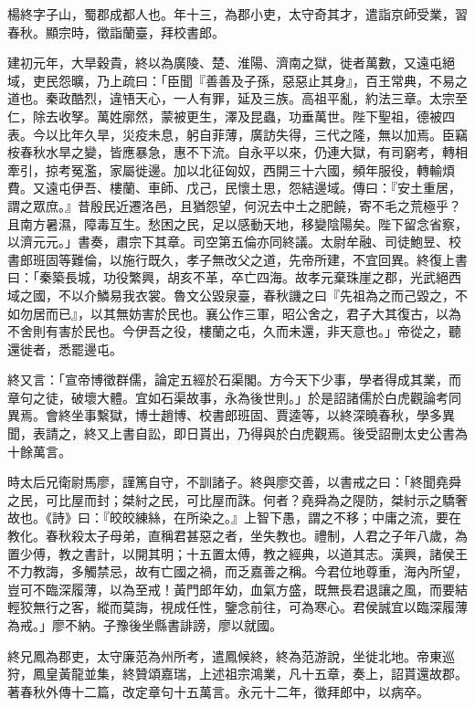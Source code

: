 
\begin{pinyinscope}
楊終字子山，蜀郡成都人也。年十三，為郡小吏，太守奇其才，遣詣京師受業，習春秋。顯宗時，徵詣蘭臺，拜校書郎。

建初元年，大旱穀貴，終以為廣陵、楚、淮陽、濟南之獄，徙者萬數，又遠屯絕域，吏民怨曠，乃上疏曰：「臣聞『善善及子孫，惡惡止其身』，百王常典，不易之道也。秦政酷烈，違啎天心，一人有罪，延及三族。高祖平亂，約法三章。太宗至仁，除去收孥。萬姓廓然，蒙被更生，澤及昆蟲，功垂萬世。陛下聖祖，德被四表。今以比年久旱，災疫未息，躬自菲薄，廣訪失得，三代之隆，無以加焉。臣竊桉春秋水旱之變，皆應暴急，惠不下流。自永平以來，仍連大獄，有司窮考，轉相牽引，掠考冤濫，家屬徙邊。加以北征匈奴，西開三十六國，頻年服役，轉輸煩費。又遠屯伊吾、樓蘭、車師、戊己，民懷土思，怨結邊域。傳曰：『安土重居，謂之眾庶。』昔殷民近遷洛邑，且猶怨望，何況去中土之肥饒，寄不毛之荒極乎？且南方暑濕，障毒互生。愁困之民，足以感動天地，移變陰陽矣。陛下留念省察，以濟元元。」書奏，肅宗下其章。司空第五倫亦同終議。太尉牟融、司徒鮑昱、校書郎班固等難倫，以施行既久，孝子無改父之道，先帝所建，不宜回異。終復上書曰：「秦築長城，功役繁興，胡亥不革，卒亡四海。故孝元棄珠崖之郡，光武絕西域之國，不以介鱗易我衣裳。魯文公毀泉臺，春秋譏之曰『先祖為之而己毀之，不如勿居而已』，以其無妨害於民也。襄公作三軍，昭公舍之，君子大其復古，以為不舍則有害於民也。今伊吾之役，樓蘭之屯，久而未還，非天意也。」帝從之，聽還徙者，悉罷邊屯。

終又言：「宣帝博徵群儒，論定五經於石渠閣。方今天下少事，學者得成其業，而章句之徒，破壞大體。宜如石渠故事，永為後世則。」於是詔諸儒於白虎觀論考同異焉。會終坐事繫獄，博士趙博、校書郎班固、賈逵等，以終深曉春秋，學多異聞，表請之，終又上書自訟，即日貰出，乃得與於白虎觀焉。後受詔刪太史公書為十餘萬言。

時太后兄衛尉馬廖，謹篤自守，不訓諸子。終與廖交善，以書戒之曰：「終聞堯舜之民，可比屋而封；桀紂之民，可比屋而誅。何者？堯舜為之隄防，桀紂示之驕奢故也。《詩》曰：『皎皎練絲，在所染之。』上智下愚，謂之不移；中庸之流，要在教化。春秋殺太子母弟，直稱君甚惡之者，坐失教也。禮制，人君之子年八歲，為置少傅，教之書計，以開其明；十五置太傅，教之經典，以道其志。漢興，諸侯王不力教誨，多觸禁忌，故有亡國之禍，而乏嘉善之稱。今君位地尊重，海內所望，豈可不臨深履薄，以為至戒！黃門郎年幼，血氣方盛，既無長君退讓之風，而要結輕狡無行之客，縱而莫誨，視成任性，鑒念前往，可為寒心。君侯誠宜以臨深履薄為戒。」廖不納。子豫後坐縣書誹謗，廖以就國。

終兄鳳為郡吏，太守廉范為州所考，遣鳳候終，終為范游說，坐徙北地。帝東巡狩，鳳皇黃龍並集，終贊頌嘉瑞，上述祖宗鴻業，凡十五章，奏上，詔貰還故郡。著春秋外傳十二篇，改定章句十五萬言。永元十二年，徵拜郎中，以病卒。


\end{pinyinscope}

